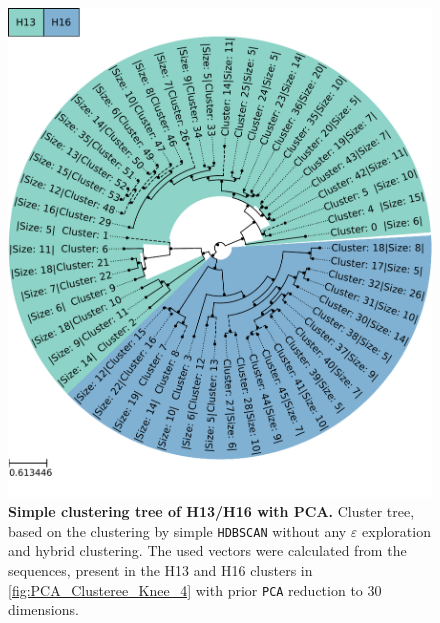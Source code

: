 \begin{figure}[!hbt]
    \centering
    \includegraphics[width=\textwidth]{PCA/Clustertree_Segment_4_H_Simple.pdf}
    \caption[Simple clustering tree of H13/H16 with PCA]{\textbf{Simple clustering tree of H13/H16 with PCA.} Cluster tree, based on the clustering by simple \texttt{HDBSCAN} without any $\varepsilon$ exploration and hybrid clustering. The used vectors were calculated from the sequences, present in the H13 and H16 clusters in \autoref{fig:PCA_Clusteree_Knee_4} with prior \texttt{PCA} reduction to 30 dimensions.}
    \label{fig:Simple_Clustertree_PCA}
\end{figure}

